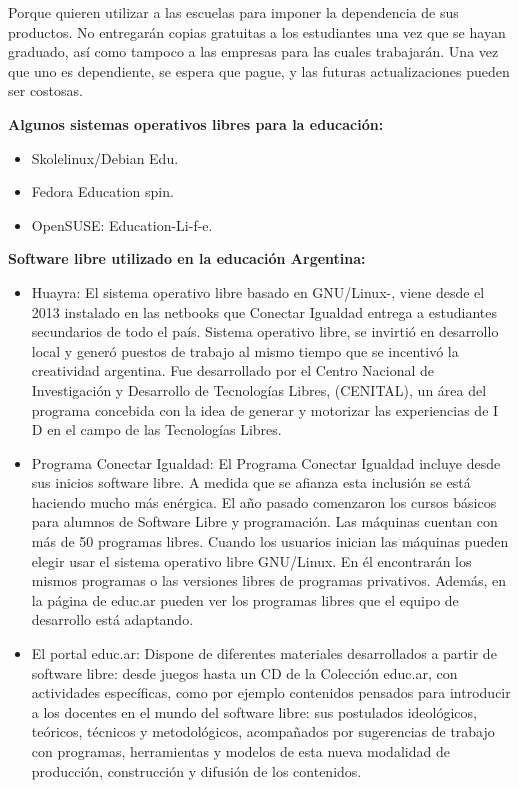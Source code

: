 Porque quieren utilizar a las escuelas para imponer la dependencia de sus productos. No entregarán copias gratuitas a los estudiantes una vez que se hayan graduado, así como tampoco a las empresas para las cuales trabajarán. Una vez que uno es dependiente, se espera que pague, y las futuras actualizaciones pueden ser costosas.


{\bf Algunos sistemas operativos libres para la educación:}
\begin{itemize}
\item Skolelinux/Debian Edu.
\item Fedora Education spin.
\item OpenSUSE: Education-Li-f-e.
\end{itemize}

{\bf Software libre utilizado en la educación Argentina:}
\begin{itemize}
\item Huayra: El sistema operativo libre basado en GNU/Linux-, viene desde el 2013 instalado en las netbooks que Conectar Igualdad entrega a estudiantes secundarios de todo el país. Sistema operativo libre, se invirtió en desarrollo local y generó puestos de trabajo al mismo tiempo que se incentivó la creatividad argentina. Fue desarrollado por el Centro Nacional de Investigación y Desarrollo de Tecnologías Libres, (CENITAL), un área del programa concebida con la idea de generar y motorizar las experiencias de I D en el campo de las Tecnologías Libres.
\item Programa Conectar Igualdad: El Programa Conectar Igualdad incluye desde sus inicios software libre. A medida que se afianza esta inclusión se está haciendo mucho más enérgica. El año pasado comenzaron los cursos básicos para alumnos de Software Libre y programación. Las máquinas cuentan con más de 50 programas libres. Cuando los usuarios inician las máquinas pueden elegir usar el sistema operativo libre GNU/Linux. En él encontrarán los mismos programas o las versiones libres de programas privativos. Además, en la página de educ.ar pueden ver los programas libres que el equipo de desarrollo está adaptando.
\item El portal educ.ar: Dispone de diferentes materiales desarrollados a partir de software libre: desde juegos hasta un CD de la Colección educ.ar, con actividades específicas, como por ejemplo contenidos pensados para introducir a los docentes en el mundo del software libre: sus postulados ideológicos, teóricos, técnicos y metodológicos, acompañados por sugerencias de trabajo con programas, herramientas y modelos de esta nueva modalidad de producción, construcción y difusión de los contenidos.
\end{itemize}

